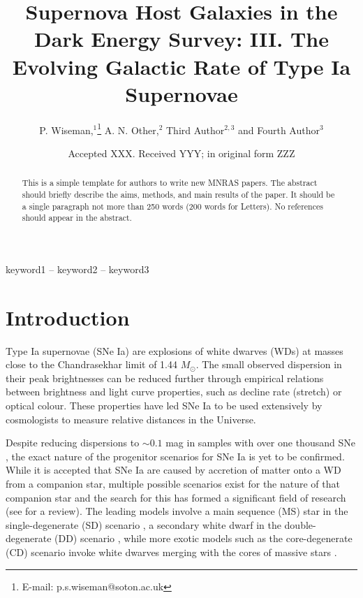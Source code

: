 \documentclass[fleqn,usenatbib]{mnras}
\title[DES SN Ia Galactic Rate]{Supernova Host Galaxies in the Dark Energy Survey: III. The Evolving Galactic Rate of Type Ia Supernovae}
\author[P. Wiseman et al.]{
P. Wiseman,$^{1}$\thanks{E-mail: p.s.wiseman@soton.ac.uk}
A. N. Other,$^{2}$
Third Author$^{2,3}$
and Fourth Author$^{3}$
\\
}
\date{Accepted XXX. Received YYY; in original form ZZZ}
\begin{document}
\label{firstpage}
\pagerange{\pageref{firstpage}--\pageref{lastpage}}
\maketitle

\begin{abstract}
This is a simple template for authors to write new MNRAS papers.
The abstract should briefly describe the aims, methods, and main results of the paper.
It should be a single paragraph not more than 250 words (200 words for Letters).
No references should appear in the abstract.
\end{abstract}

\begin{keywords}
keyword1 -- keyword2 -- keyword3
\end{keywords}



\section{Introduction}

Type Ia supernovae (SNe Ia) are explosions of white dwarves (WDs) at masses close to the Chandrasekhar limit of 1.44 $M_{\odot}$. The small observed dispersion in their peak brightnesses can be reduced further through empirical relations between brightness and light curve properties, such as decline rate (stretch) or optical colour. These properties have led SNe Ia to be used extensively by cosmologists to measure relative distances in the Universe.

Despite reducing dispersions to $\sim 0.1$ mag in samples with over one thousand SNe \citep{Scolnic2018}, the exact nature of the progenitor scenarios for SNe Ia is yet to be confirmed. While it is accepted that SNe Ia are caused by accretion of matter onto a WD from a companion star, multiple possible scenarios exist for the nature of that companion star and the search for this has formed a significant field of research (see \citealt{Maoz2014} for a review). The leading models involve a main sequence (MS) star in the single-degenerate (SD) scenario \citep{Whelan1973,Nomoto1982}, a secondary white dwarf in the double-degenerate (DD) scenario \citep{Tutukov1976,Iben1984,Webbink1984}, while more exotic models such as the core-degenerate (CD) scenario invoke white dwarves merging with the cores of massive stars \citep{Soker2019}. 
\end{document}
